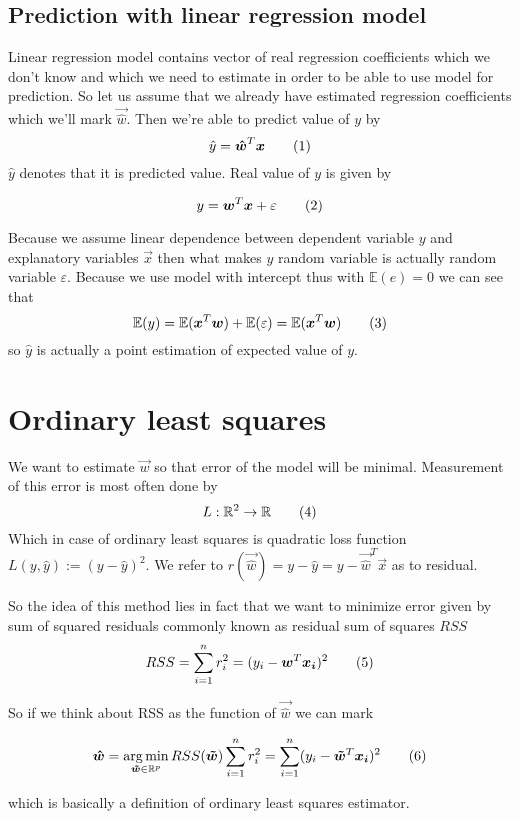 \subsection{Prediction with linear regression model}
Linear regression model contains vector of real regression coefficients which we don't know and which we need to estimate in order to be able to use model for prediction. So let us assume that we already have estimated regression coefficients which we'll mark $\vec{\hat{w}}$. Then we're able to predict value of $y$ by
\[
    \hat{y} = \vec{\hat{w}}^T\vec{x} \numberthis
\]
$\hat{y}$ denotes that it is predicted value. Real value of $y$ is given by 

\[
    y = \vec{w}^T\vec{x} + \varepsilon \numberthis
\]

Because we assume linear dependence between dependent variable $y$ and explanatory variables $\vec{x}$ then what makes $y$ random variable is actually random variable $\varepsilon$. Because we use model with intercept thus with $\mathbb{E}(e) = 0$ we can see that 
\[
\mathbb{E}(y) =\mathbb{E}(\vec{x}^T\vec{w}) + \mathbb{E}(\varepsilon) = \mathbb{E}(\vec{x}^T\vec{w})
\numberthis
\]
so $\hat{y}$ is actually a point estimation of expected value of $y$.


\section{Ordinary least squares}
We want to estimate $\vec{w}$ so that error of the model will be minimal. Measurement of this error is most often done by  
\[ 
L : \mathbb{R}^2 \rightarrow  \mathbb{R} \numberthis
\]
Which in case of ordinary least squares is quadratic loss function $L(y, \hat{y}) := (y - \hat{y})^2$. We refer to $r(\vec{\hat{w}}) = y - \hat{y} = y - \vec{\hat{w}}^T\vec{x} $ as to residual. 

So the idea of this method lies in fact that we want to minimize error given by sum of squared residuals commonly known as residual sum of squares $RSS$
\[
    RSS = \sum\limits_{i=1}^n r_i^2 = (y_i - \vec{w}^T\vec{x_i})^2 \numberthis
\]

So if we think about RSS as the function of $\vec{\hat{w}}$ we can mark

\[
    \vec{\hat{w}} = \argmin_{\vec{\tilde{w}} \in \mathbb{R}^p} RSS(\vec{\tilde{w}}) \sum\limits_{i=1}^n r_i^2 = 
    \sum\limits_{i=1}^n (y_i - \vec{\tilde{w}}^T\vec{x_i})^2 \numberthis
\]

which is basically a definition of ordinary least squares estimator.


